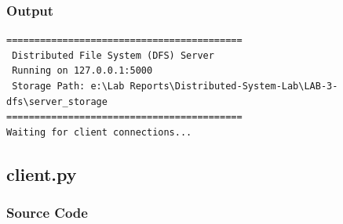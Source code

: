 \documentclass[main]{subfiles}
\begin{document}
\subsubsection*{Output}
\begin{verbatim}
==========================================
 Distributed File System (DFS) Server
 Running on 127.0.0.1:5000
 Storage Path: e:\Lab Reports\Distributed-System-Lab\LAB-3-dfs\server_storage
==========================================
Waiting for client connections...
\end{verbatim}

\subsection*{client.py}

\subsubsection*{Source Code}
\end{document}
